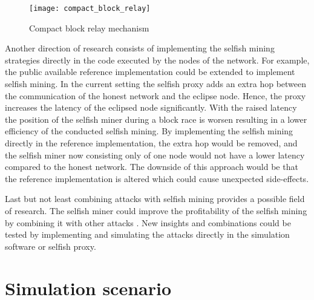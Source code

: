 \begin{figure}[t]
\texttt{[image: compact\_block\_relay]}
\centering
\caption{Compact block relay mechanism \cite{bip152}}
\label{fig:compact_block_relay}
\end{figure}

Another direction of research consists of implementing the selfish mining strategies directly in the code executed by the nodes of the network.
For example, the public available reference implementation could be extended to implement selfish mining.
In the current setting the selfish proxy adds an extra hop between the communication of the honest network and the eclipse node.
Hence, the proxy increases the latency of the eclipsed node significantly.
With the raised latency the position of the selfish miner during a block race is worsen resulting in a lower efficiency of the conducted selfish mining.
By implementing the selfish mining directly in the reference implementation, the extra hop would be removed, and the selfish miner now consisting only of one node would not have a lower latency compared to the honest network.
The downside of this approach would be that the reference implementation is altered which could cause unexpected side-effects.

Last but not least combining attacks with selfish mining provides a possible field of research.
The selfish miner could improve the profitability of the selfish mining by combining it with other attacks \cite{gervais2016security, sapirshtein2016optimal, nayak2016stubborn, gervais2015tampering}.
New insights and combinations could be tested by implementing and simulating the attacks directly in the simulation software or selfish proxy.

\section{Simulation scenario}

